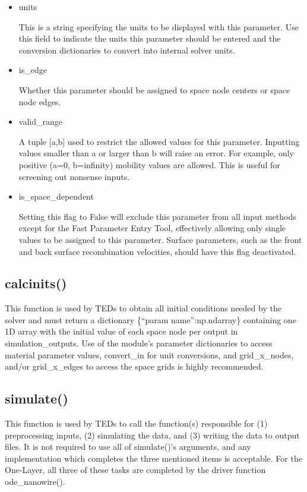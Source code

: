 \documentclass[11pt,letterpaper,titlepage]{article}
\begin{document}
		\begin{itemize}
			\item units
			\par This is a string specifying the units to be displayed with this parameter. Use this field to indicate the units this parameter should be entered and the conversion dictionaries to convert into internal solver units.
			
			\item is\_edge
			\par Whether this parameter should be assigned to space node centers or space node edges.
			
			\item valid\_range
			\par A tuple [a,b] used to restrict the allowed values for this parameter. Inputting values smaller than a or larger than b will raise an error. For example, only positive (a=0, b=infinity) mobility values are allowed. This is useful for screening out nonsense inputs.
			
			\item is\_space\_dependent
			\par Setting this flag to False will exclude this parameter from all input methods except for the Fast Parameter Entry Tool, effectively allowing only single values to be assigned to this parameter. Surface parameters, such as the front and back surface recombination velocities, should have this flag deactivated.
				
		\end{itemize}
	
		\subsection{calc\textunderscore inits()}
		\par This function is used by TEDs to obtain all initial conditions needed by the solver and must return a dictionary \{“param name”:np.ndarray\} containing one 1D array with the initial value of each space node per output in simulation\_outputs. Use of the module’s parameter dictionaries to access material parameter values, convert\_in for unit conversions, and grid\_x\_nodes, and/or grid\_x\_edges to access the space grids is highly recommended.
		
		\subsection{simulate()}
		\par This function is used by TEDs to call the function(s) responsible for (1) preprocessing inputs, (2) simulating the data, and (3) writing the data to output files. It is not required to use all of simulate()’s arguments, and any implementation which completes the three mentioned items is acceptable. For the One-Layer, all three of these tasks are completed by the driver function ode\_nanowire().
		
\end{document}
